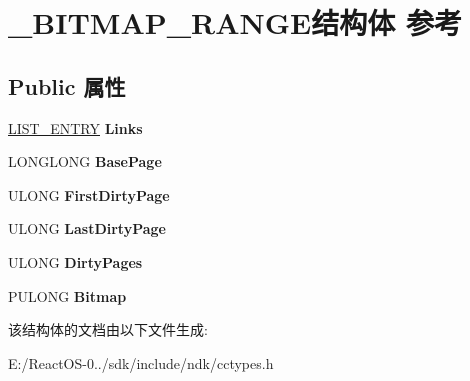 \hypertarget{struct___b_i_t_m_a_p___r_a_n_g_e}{}\section{\+\_\+\+B\+I\+T\+M\+A\+P\+\_\+\+R\+A\+N\+G\+E结构体 参考}
\label{struct___b_i_t_m_a_p___r_a_n_g_e}
\subsection*{Public 属性}
\begin{DoxyCompactItemize}
\item 
\mbox{\label{struct___b_i_t_m_a_p___r_a_n_g_e_a6d4042a4ffab2a04a86dc4439d265260}} 
\hyperlink{struct___l_i_s_t___e_n_t_r_y}{L\+I\+S\+T\+\_\+\+E\+N\+T\+RY} {\bfseries Links}
\item 
\mbox{\label{struct___b_i_t_m_a_p___r_a_n_g_e_adb535664c17fe24cfeb6cb56de90f7d2}} 
L\+O\+N\+G\+L\+O\+NG {\bfseries Base\+Page}
\item 
\mbox{\label{struct___b_i_t_m_a_p___r_a_n_g_e_a52013145da29808331118569d2832576}} 
U\+L\+O\+NG {\bfseries First\+Dirty\+Page}
\item 
\mbox{\label{struct___b_i_t_m_a_p___r_a_n_g_e_af8fb99bf7d74614410909a878c53b99a}} 
U\+L\+O\+NG {\bfseries Last\+Dirty\+Page}
\item 
\mbox{\label{struct___b_i_t_m_a_p___r_a_n_g_e_ab27e7eda86d4677a44214c5aafbf49fe}} 
U\+L\+O\+NG {\bfseries Dirty\+Pages}
\item 
\mbox{\label{struct___b_i_t_m_a_p___r_a_n_g_e_aea3bbe17ea8da429a060ef9526f7d962}} 
P\+U\+L\+O\+NG {\bfseries Bitmap}
\end{DoxyCompactItemize}


该结构体的文档由以下文件生成\+:\begin{DoxyCompactItemize}
\item 
E\+:/\+React\+O\+S-\/0../sdk/include/ndk/cctypes.\+h\end{DoxyCompactItemize}
